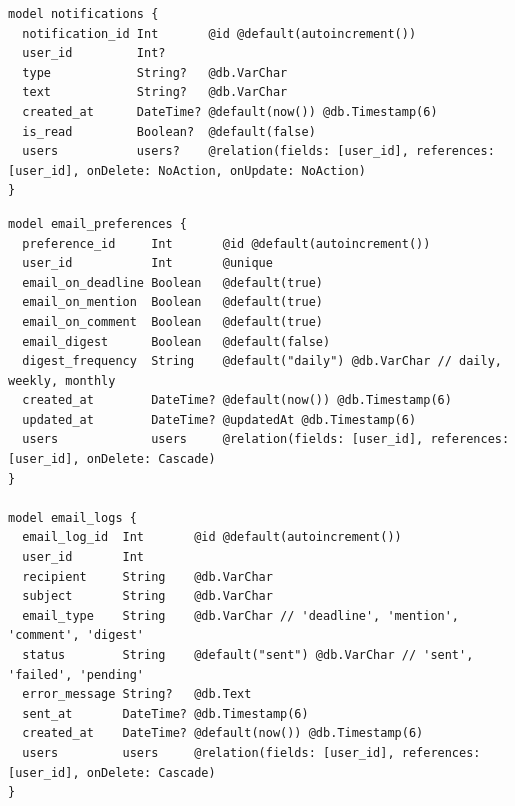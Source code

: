 \begin{listing}[H]
\begin{verbatim}
model notifications {
  notification_id Int       @id @default(autoincrement())
  user_id         Int?
  type            String?   @db.VarChar
  text            String?   @db.VarChar
  created_at      DateTime? @default(now()) @db.Timestamp(6)
  is_read         Boolean?  @default(false)
  users           users?    @relation(fields: [user_id], references: [user_id], onDelete: NoAction, onUpdate: NoAction)
}
\end{verbatim}
\caption{Prisma -- Chat- und Benachrichtigungsmodelle}
\label{lst:prisma_chat}
\end{listing}

\begin{listing}[H]
\begin{verbatim}
model email_preferences {
  preference_id     Int       @id @default(autoincrement())
  user_id           Int       @unique
  email_on_deadline Boolean   @default(true)
  email_on_mention  Boolean   @default(true)
  email_on_comment  Boolean   @default(true)
  email_digest      Boolean   @default(false)
  digest_frequency  String    @default("daily") @db.VarChar // daily, weekly, monthly
  created_at        DateTime? @default(now()) @db.Timestamp(6)
  updated_at        DateTime? @updatedAt @db.Timestamp(6)
  users             users     @relation(fields: [user_id], references: [user_id], onDelete: Cascade)
}

model email_logs {
  email_log_id  Int       @id @default(autoincrement())
  user_id       Int
  recipient     String    @db.VarChar
  subject       String    @db.VarChar
  email_type    String    @db.VarChar // 'deadline', 'mention', 'comment', 'digest'
  status        String    @default("sent") @db.VarChar // 'sent', 'failed', 'pending'
  error_message String?   @db.Text
  sent_at       DateTime? @db.Timestamp(6)
  created_at    DateTime? @default(now()) @db.Timestamp(6)
  users         users     @relation(fields: [user_id], references: [user_id], onDelete: Cascade)
}
\end{verbatim}
\caption{Prisma -- E-Mail-Modelle}
\label{lst:prisma_email}
\end{listing}